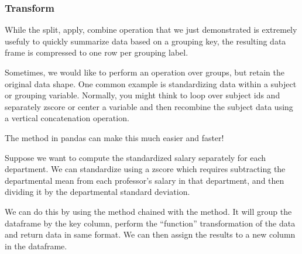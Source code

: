 \documentclass[letterpaper,10pt,english]{sphinxmanual}
\begin{document}
\subsubsection{Transform}
\label{\detokenize{content/Introduction_to_Pandas:transform}}
While the split, apply, combine operation that we just demonstrated is extremely usefuly to quickly summarize data based on a grouping key, the resulting data frame is compressed to one row per grouping label.

Sometimes, we would like to perform an operation over groups, but retain the original data shape. One common example is standardizing data within a subject or grouping variable. Normally, you might think to loop over subject ids and separately z\sphinxhyphen{}score or center a variable and then recombine the subject data using a vertical concatenation operation.

The  method in pandas can make this much easier and faster!

Suppose we want to compute the standardized salary separately for each department. We can standardize using a z\sphinxhyphen{}score which requires subtracting the departmental mean from each professor’s salary in that department, and then dividing it by the departmental standard deviation.

We can do this by using the  method chained with the  method. It will group the dataframe by the key column, perform the “function” transformation of the data and return data in same format. We can then assign the results to a new column in the dataframe.

\begin{sphinxVerbatim}[commandchars=\\\{\}]
\PYG{p}{[}\PYG{p}{]}  \PYG{p}{[}\PYG{p}{]}  \PYG{p}{[}\PYG{p}{]}\PYG{p}{[}\PYG{p}{]}
\end{sphinxVerbatim}
\end{document}
